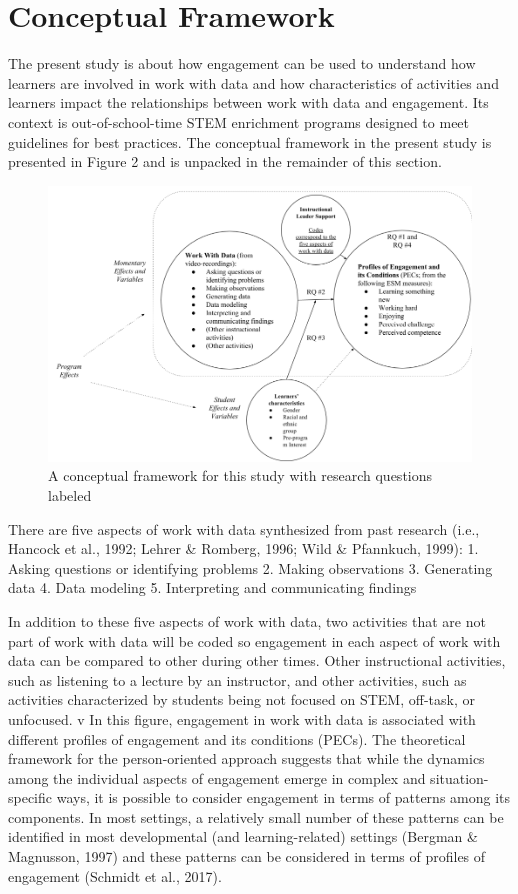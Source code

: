 \documentclass[]{book}
\theoremstyle{definition}
\theoremstyle{definition}
\theoremstyle{definition}
\theoremstyle{remark}
\begin{document}
\section{Conceptual Framework}\label{conceptual-framework}

The present study is about how engagement can be used to understand how
learners are involved in work with data and how characteristics of
activities and learners impact the relationships between work with data
and engagement. Its context is out-of-school-time STEM enrichment
programs designed to meet guidelines for best practices. The conceptual
framework in the present study is presented in Figure 2 and is unpacked
in the remainder of this section.

\begin{figure}

{\centering \includegraphics[width=0.8\linewidth]{images/figure2} 

}

\caption{A conceptual framework for this study with research questions labeled}\label{fig:unnamed-chunk-2}
\end{figure}

There are five aspects of work with data synthesized from past research
(i.e., Hancock et al., 1992; Lehrer \& Romberg, 1996; Wild \& Pfannkuch,
1999): 1. Asking questions or identifying problems 2. Making
observations 3. Generating data 4. Data modeling 5. Interpreting and
communicating findings

In addition to these five aspects of work with data, two activities that
are not part of work with data will be coded so engagement in each
aspect of work with data can be compared to other during other times.
Other instructional activities, such as listening to a lecture by an
instructor, and other activities, such as activities characterized by
students being not focused on STEM, off-task, or unfocused. v In this
figure, engagement in work with data is associated with different
profiles of engagement and its conditions (PECs). The theoretical
framework for the person-oriented approach suggests that while the
dynamics among the individual aspects of engagement emerge in complex
and situation-specific ways, it is possible to consider engagement in
terms of patterns among its components. In most settings, a relatively
small number of these patterns can be identified in most developmental
(and learning-related) settings (Bergman \& Magnusson, 1997) and these
patterns can be considered in terms of profiles of engagement (Schmidt
et al., 2017).
\end{document}
